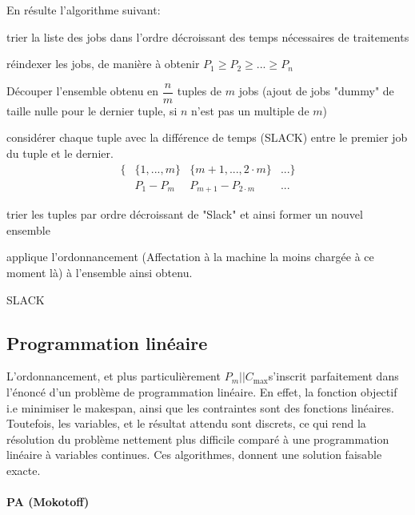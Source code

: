 \documentclass[a4paper,12pt]{report}
\theoremstyle{plain}				%
\theoremstyle{definition}				%
\newcommand\problemGraham{$P_m||C_{\max}$}
\begin{document}
En résulte l'algorithme suivant:

\bigskip
\begin{algorithm}[H]
\DontPrintSemicolon

trier la liste des jobs dans l'ordre décroissant des temps nécessaires de traitements

\BlankLine %
réindexer les jobs, de manière à obtenir $P_1 \geq P_2 \geq ... \geq P_n$

\BlankLine %
Découper l'ensemble obtenu en $\dfrac{n}{m}$ tuples de $m$ jobs (ajout
de jobs "dummy" de taille nulle pour le dernier tuple, si $n$ n'est
pas un multiple de $m$)

\BlankLine %
considérer chaque tuple avec la différence de temps (SLACK) entre le
premier job du tuple et le dernier.
\begin{align*}
\{ &\{1, ..., m\} &\{m+1,..., 2 \cdot m\} &... \} \\
   &P_1 - P_m     &P_{m+1}-P_{2 \cdot m}  &...
\end{align*}


\BlankLine %
trier les tuples par ordre décroissant de "Slack" et ainsi former un nouvel ensemble

\BlankLine %
applique l'ordonnancement (Affectation à la machine la moins chargée à ce moment là) à l'ensemble ainsi obtenu.

\caption{SLACK\label{SLACK}}
\end{algorithm}

\subsection{Programmation linéaire}

L'ordonnancement, et plus particulièrement \problemGraham s'inscrit
parfaitement dans l'énoncé d'un problème de programmation linéaire.
En effet, la fonction objectif i.e minimiser le makespan, ainsi que
les contraintes sont des fonctions linéaires.
Toutefois, les variables, et le résultat attendu sont discrets, ce qui
rend la résolution du problème nettement plus difficile comparé à une
programmation linéaire à variables continues.
Ces algorithmes, donnent une solution faisable exacte.

\paragraph{PA (Mokotoff)}
\end{document}
